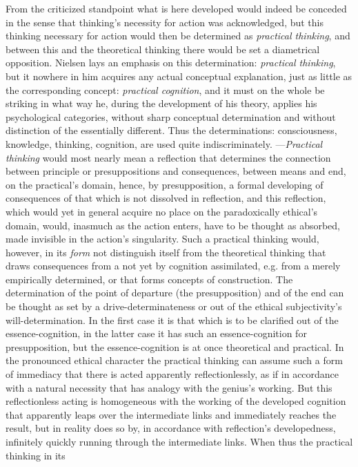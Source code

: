 \documentclass[12pt,a4paper]{book}
\begin{document}
From the criticized standpoint what is here developed would indeed be conceded in the sense
that thinking's necessity for action was acknowledged, but this thinking necessary for action
would then be determined as \emph{practical thinking}, and between this and the theoretical
thinking there would be set a diametrical opposition. Nielsen lays an emphasis on this
determination: \emph{practical thinking}, but it nowhere in him acquires any actual conceptual
explanation, just as little as the corresponding concept: \emph{practical cognition}, and it
must on the whole be striking in what way he, during the development of his theory, applies his
psychological categories, without sharp conceptual determination and without distinction of the
essentially different. Thus the determinations: consciousness, knowledge, thinking, cognition,
are used quite indiscriminately. ---\emph{Practical thinking} would most nearly mean a reflection
that determines the connection between principle or presuppositions and consequences, between
means and end, on the practical's domain, hence, by presupposition, a formal developing of
consequences of that which is not dissolved in reflection, and this reflection, which would yet
in general acquire no place on the paradoxically ethical's domain, would, inasmuch as the action
enters, have to be thought as absorbed, made invisible in the action's singularity. Such a
practical thinking would, however, in its \emph{form} not distinguish itself from the theoretical
thinking that draws consequences from a not yet by cognition assimilated, e.g. from a merely
empirically determined, or that forms concepts of construction. The determination of the point
of departure (the presupposition) and of the end can be thought as set by a drive-determinateness
or out of the ethical subjectivity's will-determination. In the first case it is that which is to
be clarified out of the essence-cognition, in the latter case it has such an essence-cognition for
presupposition, but the essence-cognition is at once theoretical and practical. In the pronounced
ethical character the practical thinking can assume such a form of immediacy that there is acted
apparently reflectionlessly, as if in accordance with a natural necessity that has analogy with
the genius's working. But this reflectionless acting is homogeneous with the working of the
developed cognition that apparently leaps over the intermediate links and immediately reaches the
result, but in reality does so by, in accordance with reflection's developedness, infinitely
quickly running through the intermediate links. When thus the practical thinking in its
\end{document}
